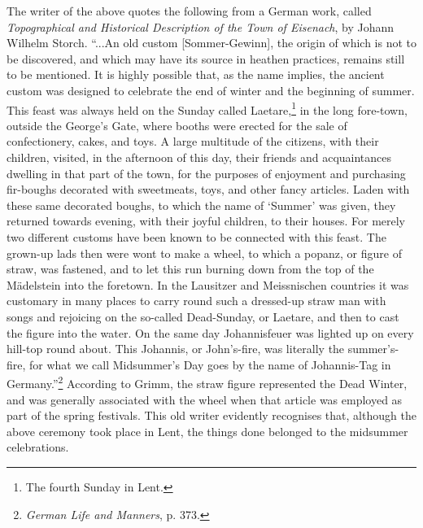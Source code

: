 \documentclass[a4paper, 11pt, oneside, polutonikogreek, english]{article}
\begin{document}
The writer of the above quotes the following from a German work, called \emph{Topographical and Historical Description of the Town of Eisenach}, by Johann Wilhelm Storch. ``...An old custom [Sommer-Gewinn], the origin of which is not to be discovered, and which may have its source in heathen practices, remains still to be mentioned. It is highly possible that, as the name implies, the ancient custom was designed to celebrate the end of winter and the beginning of summer. This feast was always held on the Sunday called Laetare,\footnote{The fourth Sunday in Lent.} in the long fore-town, outside the George's Gate, where booths were erected for the sale of confectionery, cakes, and toys. A large multitude of the citizens, with their children, visited, in the afternoon of this day, their friends and acquaintances dwelling in that part of the town, for the purposes of enjoyment and purchasing fir-boughs decorated with sweetmeats, toys, and other fancy articles. Laden with these same decorated boughs, to which the name of `Summer' was given, they returned towards evening, with their joyful children, to their houses. For merely two different customs have been known to be connected with this feast. The grown-up lads then were wont to make a wheel, to which a popanz, or figure of straw, was fastened, and to let this run burning down from the top of the Mädelstein into the foretown. In the Lausitzer and Meissnischen countries it was customary in many places to carry round such a dressed-up straw man with songs and rejoicing on the so-called Dead-Sunday, or Laetare, and then to cast the figure into the water. On the same day Johannisfeuer was lighted up on every hill-top round about. This Johannis, or John's-fire, was literally the summer's-fire, for what we call Midsummer's Day goes by the name of Johannis-Tag in Germany.''\footnote{\emph{German Life and Manners}, p. 373.} According to Grimm, the straw figure represented the Dead Winter, and was generally associated with the wheel when that article was employed as part of the spring festivals. This old writer evidently recognises that, although the above ceremony took place in Lent, the things done belonged to the midsummer celebrations.
\end{document}
